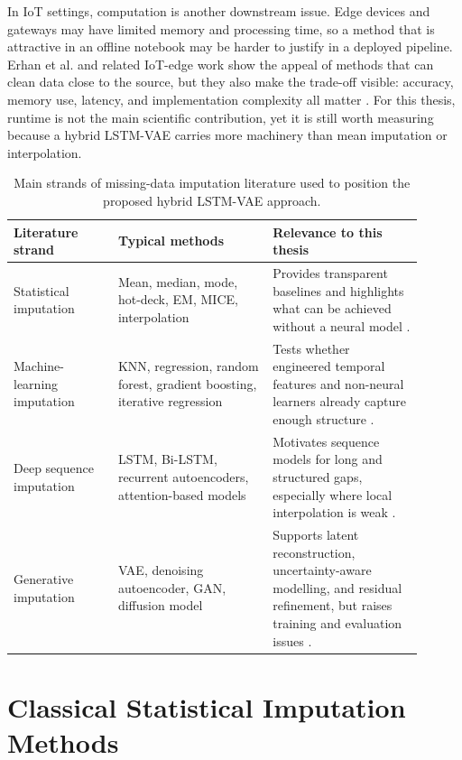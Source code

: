 In IoT settings, computation is another downstream issue. Edge devices and gateways may have limited memory and processing time, so a method that is attractive in an offline notebook may be harder to justify in a deployed pipeline. Erhan et al. and related IoT-edge work show the appeal of methods that can clean data close to the source, but they also make the trade-off visible: accuracy, memory use, latency, and implementation complexity all matter \cite{Erhan2021CriticalCO,Agbo2020BestFM}. For this thesis, runtime is not the main scientific contribution, yet it is still worth measuring because a hybrid LSTM-VAE carries more machinery than mean imputation or interpolation.

\begin{table}[ht]
	\centering
	\small
	\begin{tabular}{p{0.23\linewidth}p{0.34\linewidth}p{0.33\linewidth}}
		\toprule
		\textbf{Literature strand} & \textbf{Typical methods} & \textbf{Relevance to this thesis} \\
		\midrule
		Statistical imputation & Mean, median, mode, hot-deck, EM, MICE, interpolation & Provides transparent baselines and highlights what can be achieved without a neural model \cite{Alwateer2024MissingDI,VanBuuren2011,Dempster1997}. \\
		Machine-learning imputation & KNN, regression, random forest, gradient boosting, iterative regression & Tests whether engineered temporal features and non-neural learners already capture enough structure \cite{Raj2023MachineLB,Miao2023AnES,Lee2025ComparisonOM}. \\
		Deep sequence imputation & LSTM, Bi-LSTM, recurrent autoencoders, attention-based models & Motivates sequence models for long and structured gaps, especially where local interpolation is weak \cite{Hochreiter1997,Aqilah2025ASR,Lyu2022}. \\
		Generative imputation & VAE, denoising autoencoder, GAN, diffusion model & Supports latent reconstruction, uncertainty-aware modelling, and residual refinement, but raises training and evaluation issues \cite{Okafor2021,Ou2024MissingDataIW,Yoon2018GAINMD,Zhang2024DiffPuterED}. \\
		\bottomrule
	\end{tabular}
	\caption{Main strands of missing-data imputation literature used to position the proposed hybrid LSTM-VAE approach.}
	\label{tab:lit-strands}
\end{table}

\section{Classical Statistical Imputation Methods}

